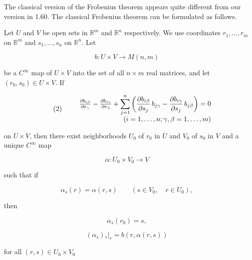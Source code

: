 \begin{remarks}\label{thm:1.61}
	The classical version of the Frobenius theorem appears quite different from our version in 1.60. The classical Frobenius theorem can be formulated as follows.

	Let $U$ and $V$ be open sets in $\mathbb{R}^m$ and $\mathbb{R}^n$ respectively. We use coordinates $r_1, \ldots, r_m$ on $\mathbb{R}^m$ and $s_1, \ldots, s_n$ on $\mathbb{R}^n$. Let

	\begin{equation}
		\tag{1}\label{eq:1.61:1}
		b\colon U\times V\to M(n,m)
	\end{equation}

	be a $C^{\infty}$ map of $U\times V$ into the set of all $n\times m$ real matrices, and let $(r_{0},s_{0})\in U\times V$. If

	\begin{equation}
		\tag{2}\label{eq:1.61:2}
		\begin{array}{r l r}&{}&{\frac{\partial b_{i\beta}}{\partial r_{\gamma}}-\frac{\partial b_{i\gamma}}{\partial r_{\beta}}+\displaystyle\sum_{j=1}^{n}\left(\frac{\partial b_{i\beta}}{\partial s_{j}}\,b_{j\gamma}-\frac{\partial b_{i\gamma}}{\partial s_{j}}\,b_{j\beta}\right)=0}\\ &{}&{(i=1,\ldots,n;\gamma,\beta=1,\ldots,m)}\end{array}
	\end{equation}

	on $U\times V$, then there exist neighborhoods $U_{0}$ of $r_{0}$ in $U$ and $V_{0}$ of $s_{0}$ in $V$ and a unique $C^{\infty}$ map

	\begin{equation}
		\tag{3}\label{eq:1.61:3}
		\alpha\colon U_{0}\times V_{0}\to V
	\end{equation}

	such that if

	\[
		\alpha_{s}(r)=\alpha(r,s)\qquad(s\in V_{0},\quad r\in U_{0}),
	\]

	then

	\begin{equation}
		\tag{4}\label{eq:1.61:4}
		\alpha_{s}(r_{0})=s,
	\end{equation}

	\[
		(\alpha_{s})_{*}|_{r}=b(r,\alpha(r,s))
	\]

	for all  $ (r,s)\in U_{0}\times V_{0} $


\end{remarks}
